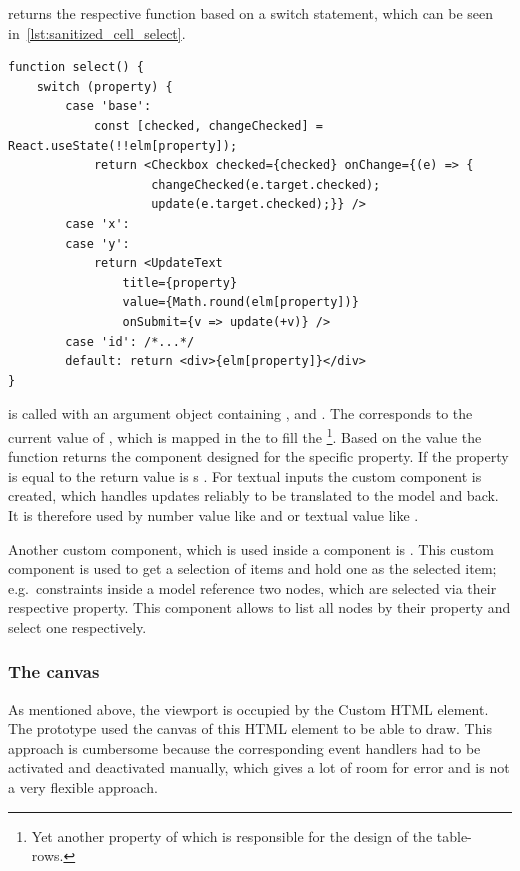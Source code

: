  returns the respective function based on a switch statement, which can be seen in~\ref{lst:sanitized_cell_select}.

\begin{lstlisting}[label={lst:sanitized_cell_select}, caption={\code{select} function in \code{SanitizedCell} of the \code{Node} component.}]
function select() {
    switch (property) {
        case 'base':
            const [checked, changeChecked] = React.useState(!!elm[property]);
            return <Checkbox checked={checked} onChange={(e) => {
                    changeChecked(e.target.checked);
                    update(e.target.checked);}} />
        case 'x':
        case 'y':
            return <UpdateText
                title={property}
                value={Math.round(elm[property])}
                onSubmit={v => update(+v)} />
        case 'id': /*...*/
        default: return <div>{elm[property]}</div>
}
\end{lstlisting}

 is called with an argument object containing ,  and .
The  corresponds to the current value of , which is mapped in the  to fill the \footnote{Yet another property of  which is responsible for the design of the table-rows.}.
Based on the  value the  function returns the component designed for the specific property.
If the property is equal to  the return value is s .
For textual inputs the custom component  is created, which handles updates reliably to be translated to the  model and back.
It is therefore used by number value like  and  or textual value like .

Another custom component, which is used inside a  component is .
This custom component is used to get a selection of items and hold one as the selected item; e.g.\ constraints inside a  model reference two nodes, which are selected via their respective  property.
This component allows to list all nodes by their  property and select one respectively.

\subsubsection{The canvas}

As mentioned above, the viewport is occupied by the  Custom HTML element.
The prototype used the canvas of this HTML element to be able to draw.
This approach is cumbersome because the corresponding event handlers had to be activated and deactivated manually, which gives a lot of room for error and is not a very flexible approach.

